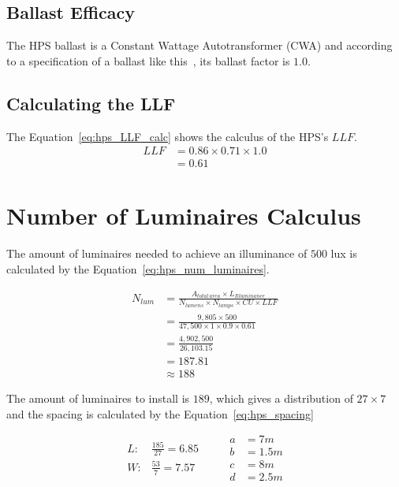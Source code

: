 \subsection{Ballast Efficacy}
The HPS ballast is a Constant Wattage Autotransformer (CWA) and according to a specification of a ballast like this~\cite{www:mh_hps_ballast}, its ballast factor is $1.0$.

\subsection{Calculating the LLF}
The Equation~\ref{eq:hps_LLF_calc} shows the calculus of the HPS's $LLF$.
\begin{equation}
\begin{split}
LLF &= 0.86 \times 0.71 \times 1.0 \\
    &= 0.61
\end{split}
\label{eq:hps_LLF_calc}
\end{equation}

\section{Number of Luminaires Calculus}
The amount of luminaires needed to achieve an illuminance of $500$ lux is calculated by the Equation~\ref{eq:hps_num_luminaires}.

\begin{equation}
\begin{split}
N_{lum} & = \frac{A_{total\,area} \times L_{Illuminance}}
                {N_{lumens} \times N_{lamps} \times CU \times LLF} \\
 & = \frac{9,805 \times 500}
          {47,500 \times 1 \times 0.9 \times 0.61} \\
 & = \frac{4,902,500}
          {26,103.15} \\
 & = 187.81 \\
 & \approx 188
\end{split}
\label{eq:hps_num_luminaires}
\end{equation}

The amount of luminaires to install is $189$, which gives a distribution of $27 \times 7$ and the spacing is calculated by the Equation~\ref{eq:hps_spacing}

\begin{equation}
\begin{split}
L: & \frac{185}
          {27} = 6.85\\
W: & \frac{53}
          {7} = 7.57
\end{split}
\qquad
\begin{split}
a & = 7 m \\
b & = 1.5 m \\
c & = 8 m \\
d & = 2.5 m
\end{split}
\label{eq:hps_spacing}
\end{equation}

